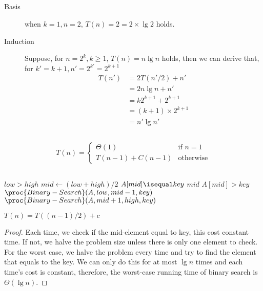 \documentclass[paper=a4, fontsize=11pt,oneside]{book} %
\numberwithin{equation}{section} %
\numberwithin{figure}{section} %
\numberwithin{table}{section} %
\begin{document}
		\subsection{}
			\begin{description}
				\item[Basis] when $k = 1,n = 2$, $T(n) = 2 = 2 \times \lg{2}$ holds.
				\item[Induction] Suppose, for $n = 2^k, k \geq 1$, $T(n) = n\lg n$ holds, then we can derive that, for $k' = k + 1, n' = 2^{k'} = 2^{k+1}$
				\begin{equation*}
				\begin{aligned}
				T(n') &= 2T(n'/2) + n' \\
						&= 2n\lg n + n' \\
						&= k2^{k+1} + 2^{k+1} \\
						&= (k+1)\times 2^{k+1} \\
						&= n' \lg n'
				\end{aligned}
				\end{equation*}
			\end{description}
		
		\subsection{}
			\[
				T(n) = 
				\begin{cases}
				\Theta(1) 	& \text{if } n = 1 \\
				T(n-1) + C(n-1) & \text{otherwise}
				\end{cases}
			\]
			
		\subsection{}
			\begin{codebox}
				\li	\If $low > high$
				\li \Then
					\Return \const{Nil}
				\End
				\li $mid \gets (low + high) / 2$
				\li \If $A[mid] \isequal key$
				\li \Then
					\Return $mid$
				\li \ElseIf $A[mid] > key$
				\li \Then
					\Return $\proc{Binary-Search}(A, low, mid - 1, key)$
				\li \Else
				\li \Return $\proc{Binary-Search}(A, mid + 1, high, key)$
				\End
				\End
				
			\end{codebox}
			
			$T(n) = T((n-1)/2) + c$ \\
			\begin{proof}
				Each time, we check if the mid-element equal to key, this cost constant time. If not, we halve the problem size unless there is only one element to check.
				For the worst case, we halve the problem every time and try to find the element that equals to the key. We can only do this for at most $\lg n$
				times and each time's cost is constant, therefore, the worst-case running time of binary search is $\Theta(\lg n)$.
			\end{proof}
			
\end{document}
